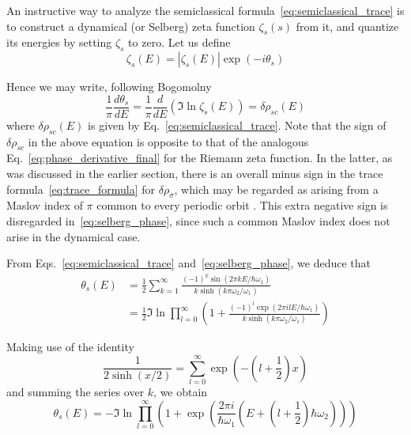 \documentclass[11pt]{article}
\theoremstyle{plain}
\begin{document}
An instructive way to analyze the semiclassical formula~\eqref{eq:semiclassical_trace} is to construct a dynamical (or Selberg) zeta function $\zeta_s(s)$ from it, and quantize its energies by setting $\zeta_s$ to zero. Let us define
\begin{equation}
\zeta_s(E) = |\zeta_s(E)| \exp(-i\theta_s)
\label{eq:selberg_def}
\end{equation}

Hence we may write, following Bogomolny \cite{bogomolny1992}
\begin{equation}
\frac{1}{\pi} \frac{d\theta_s}{dE} = \frac{1}{\pi} \frac{d}{dE}(\Im \ln \zeta_s(E)) = \delta\rho_{sc}(E)
\label{eq:selberg_phase}
\end{equation}
where $\delta\rho_{sc}(E)$ is given by Eq.~\eqref{eq:semiclassical_trace}. Note that the sign of $\delta\rho_{sc}$ in the above equation is opposite to that of the analogous Eq.~\eqref{eq:phase_derivative_final} for the Riemann zeta function. In the latter, as was discussed in the earlier section, there is an overall minus sign in the trace formula~\eqref{eq:trace_formula} for $\delta\rho_\sigma$, which may be regarded as arising from a Maslov index of $\pi$ common to every periodic orbit \cite{berry1990}. This extra negative sign is disregarded in~\eqref{eq:selberg_phase}, since such a common Maslov index does not arise in the dynamical case.

From Eqs.~\eqref{eq:semiclassical_trace} and~\eqref{eq:selberg_phase}, we deduce that
\begin{align}
\theta_s(E) &= \frac{1}{2} \sum_{k=1}^{\infty} \frac{(-1)^k \sin(2\pi kE/\hbar\omega_1)}{k \sinh(k\pi\omega_2/\omega_1)} \nonumber \\
&= \frac{1}{2} \Im \ln \prod_{l=0}^{\infty} \left( 1 + \frac{(-1)^l \exp(2\pi ilE/\hbar\omega_1)}{k \sinh(k\pi\omega_2/\omega_1)} \right)
\label{eq:selberg_phase_explicit}
\end{align}

Making use of the identity
\begin{equation}
\frac{1}{2 \sinh(x/2)} = \sum_{l=0}^{\infty} \exp\left(-\left(l + \frac{1}{2}\right)x\right)
\label{eq:sinh_identity}
\end{equation}
and summing the series over $k$, we obtain
\begin{equation}
\theta_s(E) = -\Im \ln \prod_{l=0}^{\infty} \left( 1 + \exp\left( \frac{2\pi i}{ℏ\omega_1}\left( E + \left(l + \frac{1}{2}\right)\hbar\omega_2 \right) \right) \right)
\label{eq:selberg_phase_final}
\end{equation}
\end{document}
